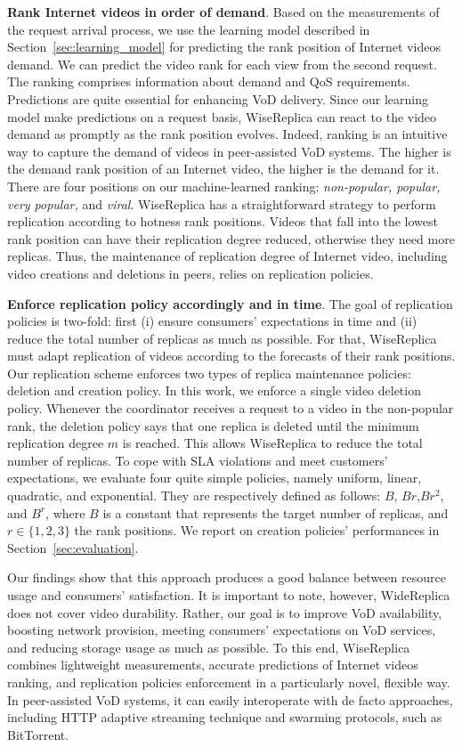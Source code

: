 \noindent
\textbf{Rank Internet videos in order of demand}. Based on the measurements of the request arrival process, we use the learning model described in Section~\ref{sec:learning_model} for predicting the rank position of Internet videos demand. We can predict the video rank for each view from the second request. The ranking comprises information about demand and QoS requirements. Predictions are quite essential for enhancing VoD delivery. Since our learning model make predictions on a request basis, WiseReplica can react to the video demand as promptly as the rank position evolves. Indeed, ranking is an intuitive way to capture the demand of videos in peer-assisted VoD systems. The higher is the demand rank position of an Internet video, the higher is the demand for it. There are four positions on our machine-learned ranking: \emph{non-popular, popular, very popular,} and \emph{viral}. WiseReplica has a straightforward strategy to perform replication according to hotness rank positions. Videos that fall into the lowest rank position can have their replication degree reduced, otherwise they need more replicas. Thus, the maintenance of replication degree of Internet video, including video creations and deletions in peers, relies on replication policies.

\noindent
\textbf{Enforce replication policy accordingly and in time}. The goal of replication policies is two-fold: first (i) ensure consumers' expectations in time and (ii) reduce the total number of replicas as much as possible. For that, WiseReplica must adapt replication of videos according to the forecasts of their rank positions. Our replication scheme enforces two types of replica maintenance policies: deletion and creation policy. In this work, we enforce a single video deletion policy.  Whenever the coordinator receives a request to a video in the non-popular rank, the deletion policy says that one replica is deleted until the minimum replication degree $m$ is reached. This allows WiseReplica to reduce the total number of replicas. To cope with SLA violations and meet customers' expectations, we evaluate four quite simple policies, namely uniform, linear, quadratic, and exponential. They are respectively defined as follows: $B$, $Br$,$Br^2$, and $B^r$, where $B$ is a constant that represents the target number of replicas, and $r \in \{1,2,3\}$ the rank positions. We report on creation policies' performances in Section~\ref{sec:evaluation}.


Our findings show that this approach produces a good balance between resource usage and consumers' satisfaction. It is important to note, however, WideReplica does not cover video durability. Rather, our goal is to improve VoD availability, boosting network provision, meeting consumers' expectations on VoD services, and reducing storage usage as much as possible. To this end, WiseReplica combines lightweight measurements, accurate predictions of Internet videos ranking, and replication policies enforcement in a particularly novel, flexible way. In peer-assisted VoD systems, it can easily interoperate with de facto approaches, including HTTP adaptive streaming technique and swarming protocols, such as BitTorrent. 
